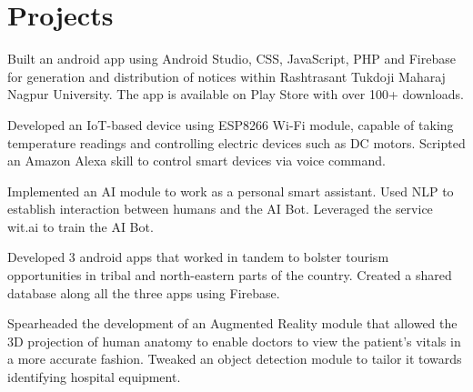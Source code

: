 \documentclass[]{deedy-resume-openfont}
\begin{document}
\begin{minipage}[t]{0.66\textwidth}

\section{Projects}
\descript{}
Built an android app using Android Studio, CSS, JavaScript, PHP and Firebase for generation and distribution of notices within Rashtrasant Tukdoji Maharaj Nagpur University. The app is available on Play Store with over 100+ downloads.
\sectionsep

\descript{}
Developed an IoT-based device using ESP8266 Wi-Fi module, capable of taking temperature readings and controlling electric devices such as DC motors. Scripted an Amazon Alexa skill to control smart devices via voice command.
\sectionsep

\descript{}
Implemented an AI module to work as a personal smart assistant. Used NLP to establish interaction between humans and the AI Bot. Leveraged the service wit.ai to train the AI Bot.
\sectionsep

Developed 3 android apps that worked in tandem to bolster tourism opportunities in tribal and north-eastern parts of the country. Created a shared database along all the three apps using Firebase.
\sectionsep

Spearheaded the development of an Augmented Reality module that allowed the 3D projection of human anatomy to enable doctors to view the patient's vitals in a more accurate fashion. Tweaked an object detection module to tailor it towards identifying hospital equipment.
\sectionsep




 

\end{minipage} 
\end{document}
